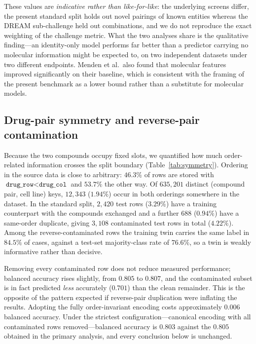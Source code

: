 \documentclass[11pt]{article}
\begin{document}
These values are \emph{indicative rather than like-for-like}: the underlying screens differ, the
present standard split holds out novel pairings of known entities whereas the DREAM sub-challenge held
out combinations, and we do not reproduce the exact weighting of the challenge metric. What the two
analyses share is the qualitative finding---an identity-only model performs far better than a predictor
carrying no molecular information might be expected to, on two independent datasets under two different
endpoints. Menden et al.\ also found that molecular features improved significantly on their baseline,
which is consistent with the framing of the present benchmark as a lower bound rather than a substitute
for molecular models.

\subsection{Drug-pair symmetry and reverse-pair contamination}
Because the two compounds occupy fixed slots, we quantified how much order-related information crosses
the split boundary (Table~\ref{tab:symmetry}). Ordering in the source data is close to arbitrary:
$46.3\%$ of rows are stored with $\texttt{drug\_row}<\texttt{drug\_col}$ and $53.7\%$ the other way.
Of $635{,}201$ distinct (compound pair, cell line) keys, $12{,}343$ ($1.94\%$) occur in both orderings
somewhere in the dataset. In the standard split, $2{,}420$ test rows ($3.29\%$) have a training
counterpart with the compounds exchanged and a further $688$ ($0.94\%$) have a same-order duplicate,
giving $3{,}108$ contaminated test rows in total ($4.22\%$). Among the reverse-contaminated rows the
training twin carries the same label in $84.5\%$ of cases, against a test-set majority-class rate of
$76.6\%$, so a twin is weakly informative rather than decisive.

Removing every contaminated row does not reduce measured performance; balanced accuracy rises slightly,
from $0.805$ to $0.807$, and the contaminated subset is in fact predicted \emph{less} accurately
($0.701$) than the clean remainder. This is the opposite of the pattern expected if reverse-pair
duplication were inflating the results. Adopting the fully order-invariant encoding costs approximately
$0.006$ balanced accuracy. Under the strictest configuration---canonical encoding with all contaminated
rows removed---balanced accuracy is $0.803$ against the $0.805$ obtained in the primary analysis, and
every conclusion below is unchanged.
\end{document}
